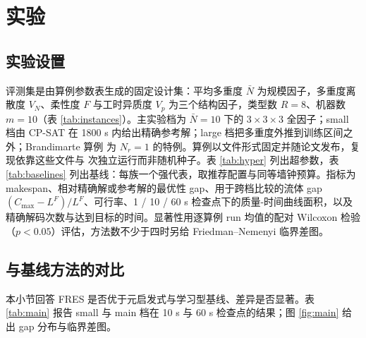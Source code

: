 \section{实验}\label{sec:experiments}


\subsection{实验设置}\label{sec:settings}
评测集是由算例参数表生成的固定设计集：平均多重度 $\bar N$ 为规模因子，多重度离散度 $V_N$、柔性度 $F$ 与工时异质度 $V_p$ 为三个结构因子，类型数 $R = 8$、机器数 $m = 10$（表 \ref{tab:instances}）。主实验档为 $\bar N = 10$ 下的 $3\times3\times3$ 全因子；small 档由 CP-SAT\cite{ortools} 在 1800 s 内给出精确参考解；large 档把多重度外推到训练区间之外；Brandimarte 算例\cite{brandimarte1993routing} 为 $N_r = 1$ 的特例。算例以文件形式固定并随论文发布，复现依靠这些文件与 \NumRuns{} 次独立运行而非随机种子。表 \ref{tab:hyper} 列出超参数，表 \ref{tab:baselines} 列出基线：每族一个强代表，取推荐配置与同等墙钟预算。指标为 makespan、相对精确解或参考解的最优性 gap、用于跨档比较的流体 gap $(C_{\max} - L^F)/L^F$、可行率、1 / 10 / 60 s 检查点下的质量-时间曲线面积，以及精确解码次数与达到目标的时间。显著性用逐算例 run 均值的配对 Wilcoxon 检验（$p < 0.05$）评估，方法数不少于四时另给 Friedman–Nemenyi 临界差图。

\begin{table}[htbp]
\centering\small
\caption{评测算例设置}\label{tab:instances}

\end{table}

\begin{table}[htbp]
\centering\small
\caption{超参数设置（草案值；终值以确认后的训练参数表为准）}\label{tab:hyper}

\end{table}

\begin{table}[htbp]
\centering\small
\caption{对比方法及配置}\label{tab:baselines}

\end{table}

\subsection{与基线方法的对比}\label{sec:comparison}
本小节回答 FRES 是否优于元启发式与学习型基线、差异是否显著。表 \ref{tab:main} 报告 small 与 main 档在 10 s 与 60 s 检查点的结果；图 \ref{fig:main} 给出 gap 分布与临界差图。

